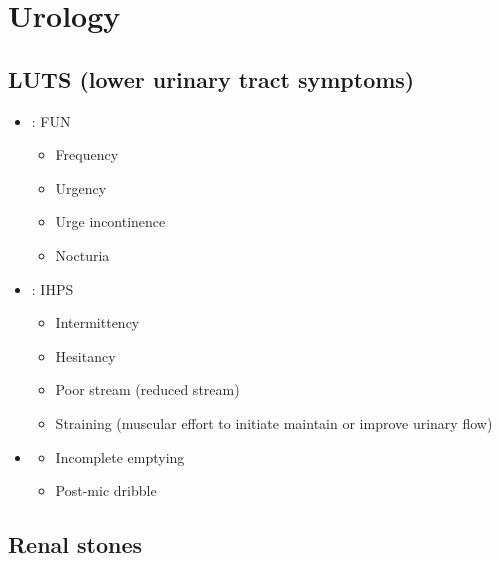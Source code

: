 \documentclass[
  14pt,
]{memoir}
\providecommand{\tightlist}{%
  \setlength{\itemsep}{0pt}\setlength{\parskip}{0pt}}
\begin{document}
\pagebreak

\hypertarget{urology}{%
\chapter{Urology}\label{urology}}

\hypertarget{luts-lower-urinary-tract-symptoms}{%
\section{LUTS (lower urinary tract
symptoms)}\label{luts-lower-urinary-tract-symptoms}}

\begin{itemize}
\tightlist
\item
  \textbf{}: FUN

  \begin{itemize}
  \tightlist
  \item
    Frequency
  \item
    Urgency
  \item
    Urge incontinence
  \item
    Nocturia
  \end{itemize}
\item
  \textbf{}: IHPS

  \begin{itemize}
  \tightlist
  \item
    Intermittency
  \item
    Hesitancy
  \item
    Poor stream (reduced stream)
  \item
    Straining (muscular effort to initiate maintain or improve urinary
    flow)
  \end{itemize}
\item
  \textbf{}

  \begin{itemize}
  \tightlist
  \item
    Incomplete emptying
  \item
    Post-mic dribble
  \end{itemize}
\end{itemize}

\pagebreak

\hypertarget{renal-stones}{%
\section{Renal stones}\label{renal-stones}}
\end{document}
